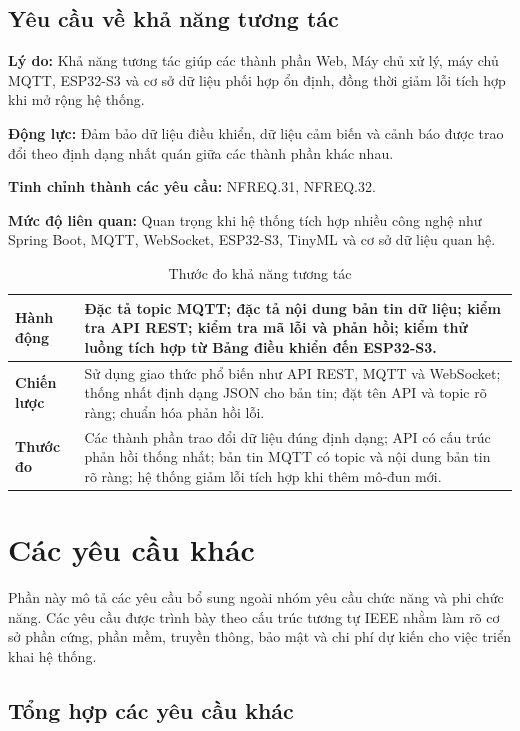 \documentclass[a4paper,12pt]{article}
\begin{document}
\subsection{Yêu cầu về khả năng tương tác}

\textbf{Lý do:} Khả năng tương tác giúp các thành phần Web, Máy chủ xử lý, máy chủ MQTT, ESP32-S3 và cơ sở dữ liệu phối hợp ổn định, đồng thời giảm lỗi tích hợp khi mở rộng hệ thống.

\textbf{Động lực:} Đảm bảo dữ liệu điều khiển, dữ liệu cảm biến và cảnh báo được trao đổi theo định dạng nhất quán giữa các thành phần khác nhau.

\textbf{Tinh chỉnh thành các yêu cầu:} NFREQ.31, NFREQ.32.

\textbf{Mức độ liên quan:} Quan trọng khi hệ thống tích hợp nhiều công nghệ như Spring Boot, MQTT, WebSocket, ESP32-S3, TinyML và cơ sở dữ liệu quan hệ.

\begin{table}[H]
\centering
\caption{Thước đo khả năng tương tác}
\small
\begin{tabularx}{\linewidth}{|p{3cm}|X|}
\hline
\textbf{Hành động} & Đặc tả topic MQTT; đặc tả nội dung bản tin dữ liệu; kiểm tra API REST; kiểm tra mã lỗi và phản hồi; kiểm thử luồng tích hợp từ Bảng điều khiển đến ESP32-S3. \\
\hline
\textbf{Chiến lược} & Sử dụng giao thức phổ biến như API REST, MQTT và WebSocket; thống nhất định dạng JSON cho bản tin; đặt tên API và topic rõ ràng; chuẩn hóa phản hồi lỗi. \\
\hline
\textbf{Thước đo} & Các thành phần trao đổi dữ liệu đúng định dạng; API có cấu trúc phản hồi thống nhất; bản tin MQTT có topic và nội dung bản tin rõ ràng; hệ thống giảm lỗi tích hợp khi thêm mô-đun mới. \\
\hline
\end{tabularx}
\end{table}

\section{Các yêu cầu khác}

Phần này mô tả các yêu cầu bổ sung ngoài nhóm yêu cầu chức năng và phi chức năng. Các yêu cầu được trình bày theo cấu trúc tương tự IEEE nhằm làm rõ cơ sở phần cứng, phần mềm, truyền thông, bảo mật và chi phí dự kiến cho việc triển khai hệ thống.

\subsection{Tổng hợp các yêu cầu khác}
\end{document}
